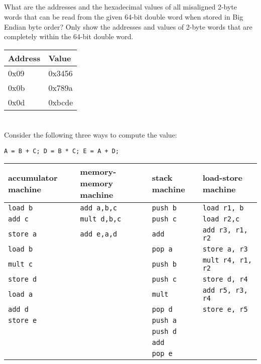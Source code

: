 \documentclass{article}
\begin{document}
\subsection{} 
What are the addresses and the hexadecimal values of all misaligned 2-byte words that can be read from the given 64-bit double word when stored in Big Endian byte order? Only show the addresses and values of 2-byte words that are completely within the 64-bit double word.
\vspace{5mm}

\begin{tabular}{|l|l|} 
\hline
Address & Value \\ 
\hline
0x09 & 0x3456 \\ \hline
0x0b & 0x789a \\ \hline
0x0d & 0xbcde \\ \hline
\end{tabular} \pagebreak

\section{}
Consider the following three ways to compute the value:
\vspace{5mm}

\texttt{A = B + C; D = B * C; E = A + D;}
\vspace{5mm}

\begin{tabular}{|l|l|l|l|}
\hline
accumulator machine & memory-memory machine & stack machine & load-store machine \\ \hline
\texttt{load b} & \texttt{add a,b,c} & \texttt{push b} & \texttt{load r1, b} \\ 
\texttt{add c} & \texttt{mult d,b,c} & \texttt{push c} & \texttt{load r2,c} \\
\texttt{store a} & \texttt{add e,a,d} & \texttt{add} & \texttt{add r3, r1, r2} \\
\texttt{load b} & & \texttt{pop a} & \texttt{store a, r3} \\
\texttt{mult c} & & \texttt{push b} & \texttt{mult r4, r1, r2} \\
\texttt{store d} & & \texttt{push c} & \texttt{store d, r4} \\ 
\texttt{load a} & & \texttt{mult} & \texttt{add r5, r3, r4} \\
\texttt{add d} & & \texttt{pop d} & \texttt{store e, r5} \\
\texttt{store e} & & \texttt{push a} & \\
& & \texttt{push d} & \\ 
& & \texttt{add} & \\
& & \texttt{pop e} & \\
\hline
\end{tabular}
\vspace{5mm}
\end{document}
